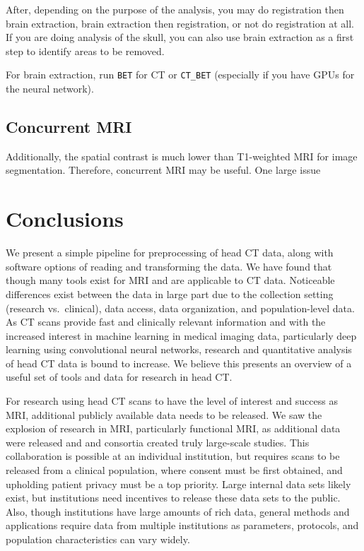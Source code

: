 \documentclass[]{elsarticle} %
\begin{document}
After, depending on the purpose of the analysis, you may do registration
then brain extraction, brain extraction then registration, or not do
registration at all. If you are doing analysis of the skull, you can
also use brain extraction as a first step to identify areas to be
removed.

For brain extraction, run \texttt{BET} for CT or \texttt{CT\_BET}
(especially if you have GPUs for the neural network).

\hypertarget{concurrent-mri}{%
\subsection{Concurrent MRI}\label{concurrent-mri}}

Additionally, the spatial contrast is much lower than T1-weighted MRI
for image segmentation. Therefore, concurrent MRI may be useful. One
large issue

\hypertarget{conclusions}{%
\section{Conclusions}\label{conclusions}}

We present a simple pipeline for preprocessing of head CT data, along
with software options of reading and transforming the data. We have
found that though many tools exist for MRI and are applicable to CT
data. Noticeable differences exist between the data in large part due to
the collection setting (research vs.~clinical), data access, data
organization, and population-level data. As CT scans provide fast and
clinically relevant information and with the increased interest in
machine learning in medical imaging data, particularly deep learning
using convolutional neural networks, research and quantitative analysis
of head CT data is bound to increase. We believe this presents an
overview of a useful set of tools and data for research in head CT.

For research using head CT scans to have the level of interest and
success as MRI, additional publicly available data needs to be released.
We saw the explosion of research in MRI, particularly functional MRI, as
additional data were released and and consortia created truly
large-scale studies. This collaboration is possible at an individual
institution, but requires scans to be released from a clinical
population, where consent must be first obtained, and upholding patient
privacy must be a top priority. Large internal data sets likely exist,
but institutions need incentives to release these data sets to the
public. Also, though institutions have large amounts of rich data,
general methods and applications require data from multiple institutions
as parameters, protocols, and population characteristics can vary
widely.
\end{document}
